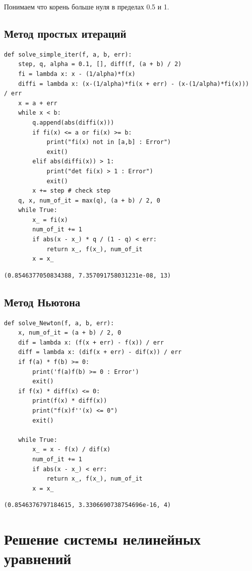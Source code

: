 \documentclass[pdf, unicode, 12pt, a4paper,oneside,fleqn]{article}
\begin{document}
Понимаем что корень больше нуля в пределах 0.5 и 1.

\subsection{Метод простых итераций}

\begin{lstlisting}
def solve_simple_iter(f, a, b, err):
    step, q, alpha = 0.1, [], diff(f, (a + b) / 2)
    fi = lambda x: x - (1/alpha)*f(x)
    diffi = lambda x: (x-(1/alpha)*fi(x + err) - (x-(1/alpha)*fi(x))) / err
    x = a + err
    while x < b:
        q.append(abs(diffi(x)))
        if fi(x) <= a or fi(x) >= b:
            print("fi(x) not in [a,b] : Error")
            exit()
        elif abs(diffi(x)) > 1:
            print("det fi(x) > 1 : Error")
            exit()
        x += step # check step
    q, x, num_of_it = max(q), (a + b) / 2, 0
    while True:
        x_ = fi(x)
        num_of_it += 1
        if abs(x - x_) * q / (1 - q) < err:
            return x_, f(x_), num_of_it
        x = x_
\end{lstlisting}


\begin{lstlisting}
(0.8546377050834388, 7.357091758031231e-08, 13)
\end{lstlisting}

\subsection{Метод Ньютона}

\begin{lstlisting}
def solve_Newton(f, a, b, err):
    x, num_of_it = (a + b) / 2, 0
    dif = lambda x: (f(x + err) - f(x)) / err
    diff = lambda x: (dif(x + err) - dif(x)) / err
    if f(a) * f(b) >= 0:
        print('f(a)f(b) >= 0 : Error')
        exit()
    if f(x) * diff(x) <= 0:
        print(f(x) * diff(x))
        print("f(x)f''(x) <= 0")
        exit()

    while True:
        x_ = x - f(x) / dif(x)
        num_of_it += 1
        if abs(x - x_) < err:
            return x_, f(x_), num_of_it
        x = x_
\end{lstlisting}

\begin{lstlisting}
(0.8546376797184615, 3.3306690738754696e-16, 4)
\end{lstlisting}


\section{Решение системы нелинейных уравнений}
\end{document}
